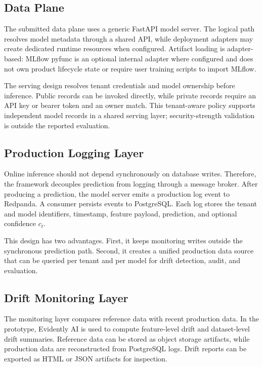 \documentclass[runningheads]{llncs}
\begin{document}
\subsection{Data Plane}

The submitted data plane uses a generic FastAPI model server. The logical path resolves model metadata through a shared API, while deployment adapters may create dedicated runtime resources when configured. Artifact loading is adapter-based: MLflow pyfunc is an optional internal adapter where configured and does not own product lifecycle state or require user training scripts to import MLflow.

The serving design resolves tenant credentials and model ownership before inference. Public records can be invoked directly, while private records require an API key or bearer token and an owner match. This tenant-aware policy supports independent model records in a shared serving layer; security-strength validation is outside the reported evaluation.

\subsection{Production Logging Layer}

Online inference should not depend synchronously on database writes. Therefore, the framework decouples prediction from logging through a message broker. After producing a prediction, the model server emits a production log event to Redpanda. A consumer persists events to PostgreSQL. Each log stores the tenant and model identifiers, timestamp, feature payload, prediction, and optional confidence $c_t$.

This design has two advantages. First, it keeps monitoring writes outside the synchronous prediction path. Second, it creates a unified production data source that can be queried per tenant and per model for drift detection, audit, and evaluation.

\subsection{Drift Monitoring Layer}

The monitoring layer compares reference data with recent production data. In the prototype, Evidently AI is used to compute feature-level drift and dataset-level drift summaries. Reference data can be stored as object storage artifacts, while production data are reconstructed from PostgreSQL logs. Drift reports can be exported as HTML or JSON artifacts for inspection.
\end{document}
